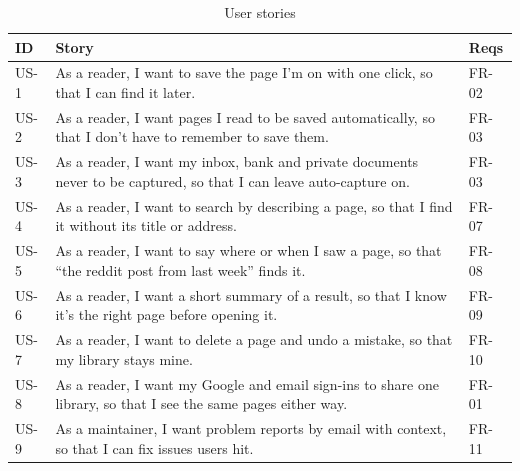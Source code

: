 \begin{table}[H]
\centering
\small
\begin{tabularx}{\textwidth}{>{\ttfamily}p{} L >{\ttfamily}p{0.1\textwidth}}
\toprule
\textrm{\textbf{ID}} & \textbf{Story} & \textrm{\textbf{Reqs}} \\
\midrule
US-1 & As a reader, I want to save the page I'm on with one click, so that I can find it later. & FR-02 \\
US-2 & As a reader, I want pages I read to be saved automatically, so that I don't have to remember to save them. & FR-03 \\
US-3 & As a reader, I want my inbox, bank and private documents never to be captured, so that I can leave auto-capture on. & FR-03 \\
US-4 & As a reader, I want to search by describing a page, so that I find it without its title or address. & FR-07 \\
US-5 & As a reader, I want to say where or when I saw a page, so that ``the reddit post from last week'' finds it. & FR-08 \\
US-6 & As a reader, I want a short summary of a result, so that I know it's the right page before opening it. & FR-09 \\
US-7 & As a reader, I want to delete a page and undo a mistake, so that my library stays mine. & FR-10 \\
US-8 & As a reader, I want my Google and email sign-ins to share one library, so that I see the same pages either way. & FR-01 \\
US-9 & As a maintainer, I want problem reports by email with context, so that I can fix issues users hit. & FR-11 \\
\bottomrule
\end{tabularx}
\caption{User stories}
\label{tab:stories}
\end{table}

